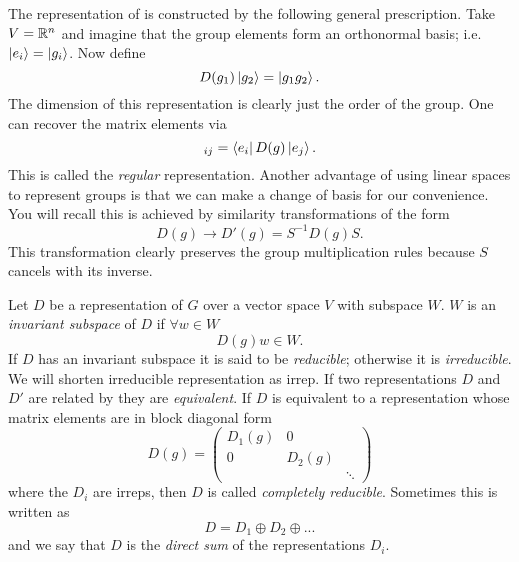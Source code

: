 The representation of  is constructed by 
the following general prescription. Take $V=\mathbb{R}^n$ 
and imagine that the group elements form an orthonormal 
basis; i.e. $\ket{e_i}=\ket{g_i}$. Now define
\begin{equation}
  D(g_1)\ket{g_2}=\ket{g_1g_2}.
\end{equation}
The dimension of this representation is clearly just the order
of the group. One can recover the matrix elements via
\begin{equation}
  [D(g)]_{ij}=\bra{e_i}D(g)\ket{e_j}.
\end{equation}
  This is called the {\it regular} 
representation. Another advantage of using linear spaces to represent groups
is that we can make a change of basis for our convenience. You
will recall this is achieved by similarity transformations
of the form
\begin{equation}\label{eq:simtr}
  D(g)\to D'(g)=S^{-1}D(g)S.
\end{equation}
This transformation clearly preserves the group multiplication
rules because $S$ cancels with its inverse.

Let $D$ be a representation of $G$ over a vector space $V$ with
subspace $W$. $W$ is an {\it invariant subspace} 
of $D$ if
$\forall w\in W$
\begin{equation}
  D(g)w\in W.
\end{equation}
If $D$ has an invariant subspace it is said to be {\it reducible};
 otherwise it is {\it irreducible}. 
We will shorten irreducible representation as irrep. If two representations $D$
and $D'$ are related by  they are {\it equivalent}.
If $D$ is equivalent to a representation whose matrix
elements are in block diagonal form
\begin{equation}
  D(g)=\left(\begin{array}{ccc}
             D_1(g) & 0      &       \\
             0      & D_2(g) &       \\
                    &        & \ddots
             \end{array}\right)
\end{equation}
where the $D_i$ are irreps, then $D$ is called {\it completely
reducible}. Sometimes this is written as
\begin{equation}
  D=D_1\oplus D_2\oplus ...
\end{equation}
and we say that $D$ is the {\it direct sum} 
of the representations $D_i$.

